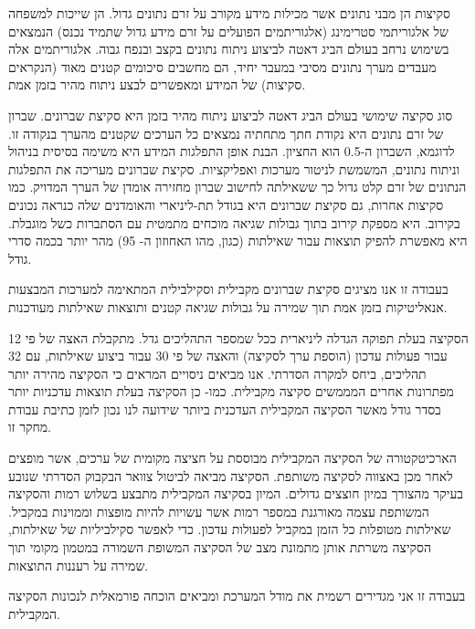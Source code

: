 {סקיצות הן מבני נתונים אשר מכילות מידע מקורב על זרם נתונים גדול. הן שייכות למשפחה של אלגוריתמי סטרימינג (אלגוריתמים הפועלים על זרם מידע גדול שתמיד נכנס) הנמצאים בשימוש נרחב בעולם הביג דאטה לביצוע ניתוח נתונים בקצב ובנפח גבוה. אלגוריתמים אלה מעבדים מערך נתונים מסיבי במעבר יחיד, הם מחשבים סיכומים קטנים מאוד (הנקראים סקיצות) של המידע ומאפשרים לבצע ניתוח מהיר בזמן אמת. 

סוג סקיצה שימושי בעולם הביג דאטה לביצוע ניתוח מהיר בזמן היא סקיצת שברונים. שברון של זרם נתונים היא נקודת חתך מתחתיה נמצאים כל הערכים שקטנים מהערך בנקודה זו. 
לדוגמא, השברון ה-0.5 הוא החציון.
הבנת אופן התפלגות המידע היא משימה בסיסית בניהול וניתוח נתונים, המשמשת לניטור מערכות ואפליקציות. 
סקיצת שברונים מעריכה את התפלגות הנתונים של זרם קלט גדול כך ששאילתה לחישוב שברון מחזירה אומדן של הערך המדויק. כמו סקיצות אחרות, גם סקיצת שברונים היא בגודל תת-ליניארי והאומדנים שלה כנראה נכונים בקירוב. היא מספקת קירוב בתוך גבולות שגיאה מוכחים מתמטית עם הסתברות כשל מוגבלת. היא מאפשרת להפיק תוצאות עבור שאילתות (כגון, מהו האחוזון ה- 95) מהר יותר בכמה סדרי גודל. 

בעבודה זו אנו מציגים סקיצת שברונים מקבילית וסקילבילית המתאימה למערכות המבצעות אנאליטיקות בזמן אמת תוך שמירה על גבולות שגיאה קטנים ותוצאות שאילתות מעודכנות. 

הסקיצה בעלת תפוקה הגדלה ליניארית ככל שמספר התהליכים גדל. מתקבלת האצה של פי 12 עבור פעולות עדכון (הוספת ערך לסקיצה) והאצה של פי 30 עבור ביצוע שאילתות, עם 32 תהליכים, ביחס למקרה הסדרתי. אנו מביאים ניסויים המראים כי הסקיצה מהירה יותר מפתרונות אחרים המממשים סקיצה מקבילית. כמו- כן הסקיצה בעלת תוצאות עדכניות יותר בסדר גודל מאשר הסקיצה המקבילית העדכנית ביותר שידועה לנו נכון לזמן כתיבת עבודת מחקר זו. 

הארכיטקטורה של הסקיצה המקבילית מבוססת על חציצה מקומית של ערכים, אשר מופצים לאחר מכן באצווה לסקיצה משותפת. הסקיצה מביאה לביטול צוואר הבקבוק הסדרתי שנובע בעיקר מהצורך במיון חוצצים גדולים. המיון בסקיצה המקבילית מתבצע בשלוש רמות והסקיצה המשותפת עצמה מאורגנת במספר רמות אשר עשויות להיות מופצות וממוינות במקביל. שאילתות מטופלות כל הזמן במקביל לפעולות עדכון. כדי לאפשר סקילביליות של שאילתות, הסקיצה משרתת אותן מתמונת מצב של הסקיצה המשופת השמורה במטמון מקומי תוך שמירה על רעננות התוצאות. 

בעבודה זו אני מגדירים רשמית את מודל המערכת ומביאים הוכחה פורמאלית לנכונות הסקיצה המקבילית. 
} %
